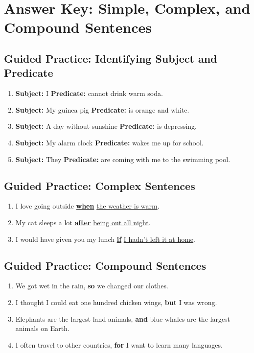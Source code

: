 \documentclass[12pt]{article}
\begin{document}
\section*{Answer Key: Simple, Complex, and Compound Sentences}

\subsection*{Guided Practice: Identifying Subject and Predicate}
\begin{enumerate}
    \item \textbf{Subject:} I \textbf{Predicate:} cannot drink warm soda.
    \item \textbf{Subject:} My guinea pig \textbf{Predicate:} is orange and white.
    \item \textbf{Subject:} A day without sunshine \textbf{Predicate:} is depressing.
    \item \textbf{Subject:} My alarm clock \textbf{Predicate:} wakes me up for school.
    \item \textbf{Subject:} They \textbf{Predicate:} are coming with me to the swimming pool.
\end{enumerate}

\subsection*{Guided Practice: Complex Sentences}
\begin{enumerate}
    \item I love going outside \textbf{\underline{when}} \underline{the weather is warm}.
    \item My cat sleeps a lot \textbf{\underline{after}} \underline{being out all night}.
    \item I would have given you my lunch \textbf{\underline{if}} \underline{I hadn't left it at home}.
\end{enumerate}

\subsection*{Guided Practice: Compound Sentences}
\begin{enumerate}
    \item We got wet in the rain, \textbf{so} we changed our clothes.
    \item I thought I could eat one hundred chicken wings, \textbf{but} I was wrong.
    \item Elephants are the largest land animals, \textbf{and} blue whales are the largest animals on Earth.
    \item I often travel to other countries, \textbf{for} I want to learn many languages.
\end{enumerate}
\end{document}
